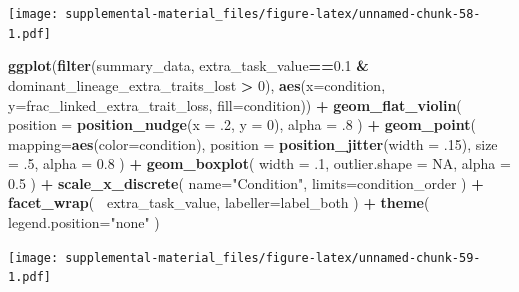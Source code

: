 \documentclass[]{book}
\newenvironment{Shaded}{\begin{snugshade}}{\end{snugshade}}
\newcommand{\DataTypeTok}[1]{\textcolor[rgb]{0.13,0.29,0.53}{#1}}
\newcommand{\DecValTok}[1]{\textcolor[rgb]{0.00,0.00,0.81}{#1}}
\newcommand{\FloatTok}[1]{\textcolor[rgb]{0.00,0.00,0.81}{#1}}
\newcommand{\KeywordTok}[1]{\textcolor[rgb]{0.13,0.29,0.53}{\textbf{#1}}}
\newcommand{\NormalTok}[1]{#1}
\newcommand{\OperatorTok}[1]{\textcolor[rgb]{0.81,0.36,0.00}{\textbf{#1}}}
\newcommand{\OtherTok}[1]{\textcolor[rgb]{0.56,0.35,0.01}{#1}}
\newcommand{\StringTok}[1]{\textcolor[rgb]{0.31,0.60,0.02}{#1}}
\begin{document}
\texttt{[image: supplemental-material\_files/figure-latex/unnamed-chunk-58-1.pdf]}

\begin{Shaded}
\begin{Highlighting}[]
\KeywordTok{ggplot}\NormalTok{(}\KeywordTok{filter}\NormalTok{(summary_data, extra_task_value}\OperatorTok{==}\FloatTok{0.1} \OperatorTok{&}\StringTok{ }\NormalTok{dominant_lineage_extra_traits_lost }\OperatorTok{>}\StringTok{ }\DecValTok{0}\NormalTok{), }\KeywordTok{aes}\NormalTok{(}\DataTypeTok{x=}\NormalTok{condition, }\DataTypeTok{y=}\NormalTok{frac_linked_extra_trait_loss, }\DataTypeTok{fill=}\NormalTok{condition)) }\OperatorTok{+}
\StringTok{  }\KeywordTok{geom_flat_violin}\NormalTok{(}
    \DataTypeTok{position =} \KeywordTok{position_nudge}\NormalTok{(}\DataTypeTok{x =} \FloatTok{.2}\NormalTok{, }\DataTypeTok{y =} \DecValTok{0}\NormalTok{),}
    \DataTypeTok{alpha =} \FloatTok{.8}
\NormalTok{  ) }\OperatorTok{+}
\StringTok{  }\KeywordTok{geom_point}\NormalTok{(}
    \DataTypeTok{mapping=}\KeywordTok{aes}\NormalTok{(}\DataTypeTok{color=}\NormalTok{condition),}
    \DataTypeTok{position =} \KeywordTok{position_jitter}\NormalTok{(}\DataTypeTok{width =} \FloatTok{.15}\NormalTok{),}
    \DataTypeTok{size =} \FloatTok{.5}\NormalTok{,}
    \DataTypeTok{alpha =} \FloatTok{0.8}
\NormalTok{  ) }\OperatorTok{+}
\StringTok{  }\KeywordTok{geom_boxplot}\NormalTok{(}
    \DataTypeTok{width =} \FloatTok{.1}\NormalTok{,}
    \DataTypeTok{outlier.shape =} \OtherTok{NA}\NormalTok{,}
    \DataTypeTok{alpha =} \FloatTok{0.5}
\NormalTok{  ) }\OperatorTok{+}
\StringTok{  }\KeywordTok{scale_x_discrete}\NormalTok{(}
    \DataTypeTok{name=}\StringTok{"Condition"}\NormalTok{,}
    \DataTypeTok{limits=}\NormalTok{condition_order}
\NormalTok{  ) }\OperatorTok{+}
\StringTok{  }\KeywordTok{facet_wrap}\NormalTok{(}
    \OperatorTok{~}\NormalTok{extra_task_value,}
    \DataTypeTok{labeller=}\NormalTok{label_both}
\NormalTok{  ) }\OperatorTok{+}
\StringTok{  }\KeywordTok{theme}\NormalTok{(}
    \DataTypeTok{legend.position=}\StringTok{"none"}
\NormalTok{  )}
\end{Highlighting}
\end{Shaded}

\texttt{[image: supplemental-material\_files/figure-latex/unnamed-chunk-59-1.pdf]}
\end{document}
